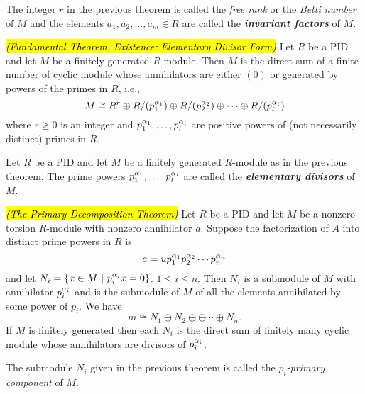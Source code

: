 \nl

\begin{defn}
The integer $r$ in the previous theorem is called the \textit{free rank} or the \textit{Betti number} of $M$ and the elements $a_1, a_2, \ldots, a_m\in R$ are called the \textit{\textbf{invariant factors}} of $M$.
\end{defn}

\nl

\begin{thm}\textit{\hl{(Fundamental Theorem, Existence: Elementary Divisor Form)}} 
Let $R$ be a PID and let $M$ be a finitely generated $R$-module. Then $M$ is the direct sum of a finite number of cyclic module whose annihilators are either $(0)$ or generated by powers of the primes in $R$, i.e.,
\[M\cong R^r \oplus R/(p_1^{\alpha_1})\oplus R/(p_2^{\alpha_2}) \oplus \cdots \oplus R/(p_t^{\alpha_t})\]
where $r\geq 0$ is an integer and $p_1^{\alpha_1},\ldots, p_t^{\alpha_t}$ are positive powers of (not necessarily distinct) primes in $R$.
\end{thm}

\nl

\begin{defn}
Let $R$ be a PID and let $M$ be a finitely generated $R$-module as in the previous theorem. The prime powers $p_1^{\alpha_1},\ldots, p_t^{\alpha_t}$ are called the \textit{\textbf{elementary divisors}} of $M$.
\end{defn}

\nl

\begin{thm}\hl{\textit{(The Primary Decomposition Theorem)}} Let $R$ be a PID and let $M$ be a nonzero torsion $R$-module with nonzero annihilator $a$. Suppose the factorization of $A$ into distinct prime powers in $R$ is 
\[a = up_1^{\alpha_1}p_2^{\alpha_2}\cdots p_n^{\alpha_n}\]
and let $N_i = \{x\in M\ |\ p_i^{\al_i}x = 0\}$. $1 \leq i\leq n$. Then $N_i$ is a submodule of $M$ with annihilator $p_i^{\alpha_i}$ and is the submodule of $M$ of all the elements annihilated by some power of $p_i$. We have
\[m\cong N_1\oplus N_2\oplus \oplus \cdots \oplus N_n.\]
If $M$ is finitely generated then each $N_i$ is the direct sum of finitely many cyclic module whose annihilators are divisors of $p_i^{\alpha_i}$.
\end{thm}

\nl

\begin{defn}
The submodule $N_i$ given in the previous theorem is called the $p_i$\textit{-primary component} of $M$.
\end{defn}


